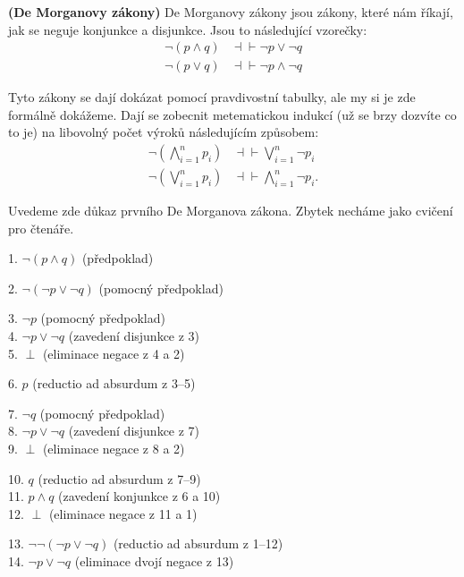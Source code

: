 \begin{example} \textbf{(De Morganovy zákony)}
  De Morganovy zákony jsou zákony, které nám říkají, jak se neguje konjunkce a disjunkce. Jsou to následující vzorečky:
  \begin{equation}
    \begin{aligned}
      \neg (p \land q) &\dashv\vdash \neg p \lor \neg q \\
      \neg (p \lor q) &\dashv\vdash \neg p \land \neg q
    \end{aligned}
  \end{equation}

  Tyto zákony se dají dokázat pomocí pravdivostní tabulky, ale my si je zde formálně dokážeme. Dají se zobecnit metematickou indukcí (už se brzy dozvíte co to je) na libovolný počet výroků následujícím způsobem:
  \begin{equation}
    \begin{aligned}
      \neg \left(\bigwedge_{i=1}^{n} p_i\right) &\dashv\vdash \bigvee_{i=1}^{n} \neg p_i \\
      \neg \left(\bigvee_{i=1}^{n} p_i\right) &\dashv\vdash \bigwedge_{i=1}^{n} \neg p_i.
    \end{aligned}
  \end{equation}

  Uvedeme zde důkaz prvního De Morganova zákona. Zbytek necháme jako cvičení pro čtenáře.

  \begin{proofbox}

    1. $\neg (p \land q)$ (předpoklad)
    \begin{proofbox}
      2. $\neg(\neg p \lor \neg q)$ (pomocný předpoklad)
      \begin{proofbox}
        3. $\neg p$ (pomocný předpoklad) \\
        4. $\neg p \lor \neg q$ (zavedení disjunkce z 3) \\
        5. $\perp$ (eliminace negace z 4 a 2)
      \end{proofbox}
      6. $p$ (reductio ad absurdum z 3--5) 
      \begin{proofbox}
        7. $\neg q$ (pomocný předpoklad) \\
        8. $\neg p \lor \neg q$ (zavedení disjunkce z 7) \\
        9. $\perp$ (eliminace negace z 8 a 2)
      \end{proofbox}
      10. $q$ (reductio ad absurdum z 7--9) \\
      11. $p \land q$ (zavedení konjunkce z 6 a 10) \\
      12. $\perp$ (eliminace negace z 11 a 1)
    \end{proofbox}
    13. $\neg\neg(\neg p \lor \neg q)$ (reductio ad absurdum z 1--12) \\
    14. $\neg p \lor \neg q$ (eliminace dvojí negace z 13)
  \end{proofbox}


\end{example}
